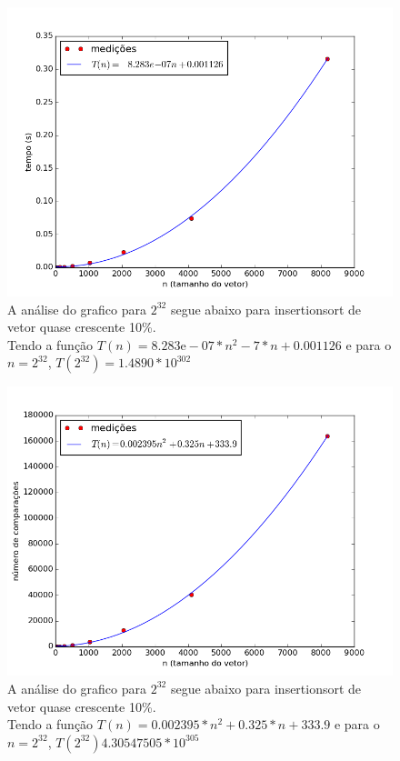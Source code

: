 \documentclass[12pt,a4paper,twoside]{report}
\begin{document}


\begin{figure}[ht]
\centering \includegraphics[scale=0.8]{../insertionsort/imagens/insertionsortQuaseCresc100.png}
\caption{A análise do grafico para $2^{32}$ segue abaixo para insertionsort de vetor quase crescente 10\%.\\
Tendo a função $T(n) = 8.283\mathrm{e}-07*n^2 - 7*n+0.001126$ e para o $n =2^{32}$, $T(2^{32}) =1.4890*10^302 $}
\label{fig:insertionsortQuaseCresc100}
\end{figure}

\begin{figure}[ht]
\centering \includegraphics[scale=0.8]{../insertionsort/imagens/insertionsortQuaseCresc101.png}
\caption{A análise do grafico para $2^{32}$ segue abaixo para insertionsort de vetor quase crescente 10\%.\\
Tendo a função $T(n) = 0.002395*n^2+0.325*n+333.9$ e para o $n =2^{32}$, $T(2^{32}) 4.30547505 * 10^{305}$}
\label{fig:insertionsortQuaseCresc101}
\end{figure}
\end{document}
